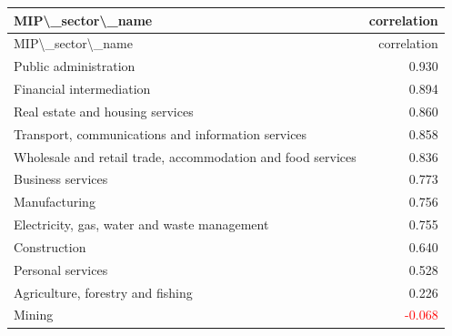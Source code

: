 \begin{longtable}{lr}
\hline
MIP\textbackslash{}_sector\textbackslash{}_name & correlation \\ 
\hline\endfirsthead
\hline
MIP\textbackslash{}_sector\textbackslash{}_name & correlation \\ 
\hline\endhead
Public administration & 0.930 \\ 
Financial intermediation & 0.894 \\ 
Real estate and housing services & 0.860 \\ 
Transport, communications and information services & 0.858 \\ 
Wholesale and retail trade, accommodation and food services & 0.836 \\ 
Business services & 0.773 \\ 
Manufacturing & 0.756 \\ 
Electricity, gas, water and waste management & 0.755 \\ 
Construction & 0.640 \\ 
Personal services & 0.528 \\ 
Agriculture, forestry and fishing & 0.226 \\ 
Mining & \textcolor{red}{-0.068} \\ 
\hline
\end{longtable}
